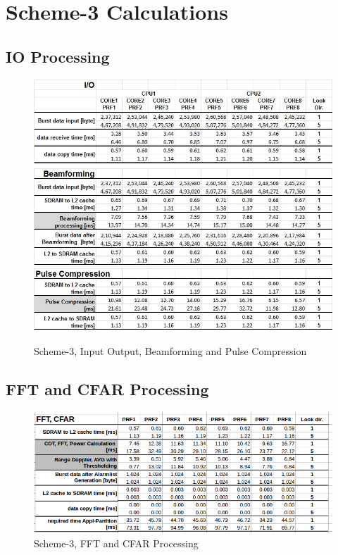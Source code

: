 \chapter{Scheme-3 Calculations}
\label{app:sch3:calc}

\section{IO Processing}
\begin{figure}[h!]
	\centering
	\includegraphics[width=140mm]{figures/scheme4_io}
	\includegraphics[width=140mm]{figures/scheme4_bf}
	\includegraphics[width=140mm]{figures/scheme4_pc}
	\caption{Scheme-3, Input Output, Beamforming and Pulse Compression}
	\label{fig:mm:scheme4_io}
\end{figure}

\section{FFT and CFAR Processing}
\FloatBarrier
\begin{figure}[h!]
	\centering
	\includegraphics[width=140mm]{figures/scheme4_fft}
	\caption{Scheme-3, FFT and CFAR Processing}
	\label{fig:mm:scheme4_fft}
\end{figure}

